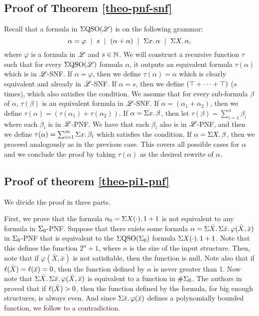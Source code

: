 \subsection*{Proof of Theorem \ref{theo-pnf-snf}}
Recall that a formula in $\Sigma{\rm QSO}(\mathscr{L})$ is on the following grammar:
$$
\alpha = \varphi \ \mid \ s \ \mid \ (\alpha + \alpha) \ \mid \ \sa{x} \alpha \ \mid \ \sa{X} \alpha,
$$
where $\varphi$ is a formula in $\mathscr{L}$ and $s\in\mathbb{N}$. We will construct a recursive function $\tau$ such that for every $\Sigma{\rm QSO}(\mathscr{L})$ formula $\alpha$, it outputs an equivalent formula $\tau(\alpha)$ which is in $\mathscr{L}$-SNF. If $\alpha = \varphi$, then we define $\tau(\alpha) = \alpha$ which is clearly equivalent and already in $\mathscr{L}$-SNF. If $\alpha = s$, then we define $(\top + \cdots + \top)$ ($s$ times), which also satisfies the condition. We assume that for every sub-formula $\beta$ of $\alpha$, $\tau(\beta)$ is an equivalent formula in $\mathscr{L}$-SNF. If $\alpha = (\alpha_1 + \alpha_2)$, then we define $\tau(\alpha) = (\tau(\alpha_1) + \tau(\alpha_2))$. If $\alpha = \Sigma{x}.\,\beta$, then let $\tau(\beta) = \sum_{i = 1}^{n}\beta_i$ where each $\beta_i$ is in $\mathscr{L}$-PNF. We have that each $\beta_i$ also is in $\mathscr{L}$-PNF, and then we define $\tau(\alpha) = \sum_{i = 1}^{m}\Sigma{x}.\,\beta_i$ which satisfies the condition. If $\alpha = \Sigma{X}.\,\beta$, then we proceed analogously as in the previous case. This covers all possible cases for $\alpha$ and we conclude the proof by taking $\tau(\alpha)$ as the desired rewrite of $\alpha$.












\subsection*{Proof of theorem \ref{theo-pi1-pnf}}
We divide the proof in three parts.

\vspace{1em}
First, we prove that the formula $\alpha_{0} = \Sigma{X(\cdot)}.\,1 + 1$ is not equivalent to any formula in $\Sigma_{0}$-PNF. Suppose that there exists some formula $\alpha = \Sigma{\bar{X}}.\,\Sigma{\bar{x}}.\,\varphi(\bar{X},\bar{x})$ in $\Sigma_{0}$-PNF that is equivalent to the $\Sigma{\rm QSO}(\Sigma_{0})$ formula $\Sigma{X(\cdot)}.\,1 + 1$. Note that this defines the function $2^{n}+1$, where $n$ is the size of the input structure. Then, note that if $\varphi(\bar{X},\bar{x})$ is not satisfiable, then the function is null. Note also that if $\ell(\bar{X}) = \ell(\bar{x}) = 0$, then the function defined by $\alpha$ is never greater than 1. Now note that $\Sigma{\bar{X}}.\,\Sigma{\bar{x}}.\,\varphi(\bar{X},\bar{x})$ is equivalent to a function in $\#\Sigma_{0}$. The authors in \cite{SalujaST95} proved that if $\ell(\bar{X}) > 0$, then the function defined by the formula, for big enough structures, is always even. And since $\Sigma{\bar{x}}.\,\varphi(\bar{x})$ defines a polynomially bounded function, we follow to a contradiction.

